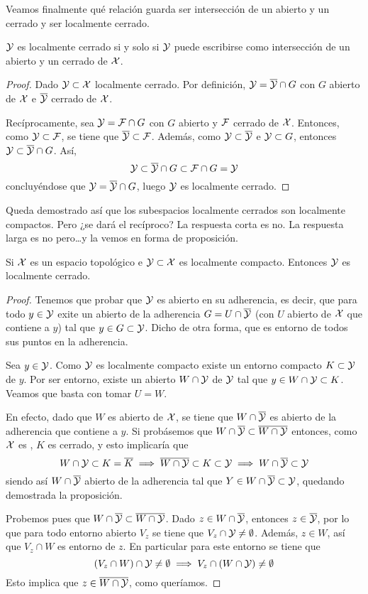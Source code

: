 Veamos finalmente qué relación guarda ser intersección de un abierto y un cerrado y ser localmente cerrado.
\begin{prop}
	$\mathcal{Y}$ es localmente cerrado si y solo si $\mathcal{Y}$ puede escribirse como intersección de un abierto y un cerrado de $\mathcal{X}$.	
\end{prop}
\begin{proof}
	Dado $\mathcal{Y}\subset\mathcal{X}$ localmente cerrado. Por definición, $\mathcal{Y}=\overline{\mathcal{Y}}\cap G$ con $G$ abierto de $\mathcal{X}$ e $\overline{\mathcal{Y}}$ cerrado de $\mathcal{X}$.
	
	Recíprocamente, sea $\mathcal{Y}=\mathcal{F}\cap G$ con $G$ abierto y $\mathcal{F}$ cerrado de $\mathcal{X}$. Entonces, como $\mathcal{Y}\subset\mathcal{F}$, se tiene que $\overline{\mathcal{Y}}\subset\mathcal{F}$. Además, como $\mathcal{Y}\subset\overline{\mathcal{Y}}$ e $\mathcal{Y}\subset G$, entonces $\mathcal{Y}\subset \overline{\mathcal{Y}}\cap G$. Así,
	\[\mathcal{Y}\subset \overline{\mathcal{Y}}\cap G\subset \mathcal{F}\cap G=\mathcal{Y}\]
	concluyéndose que $\mathcal{Y}=\overline{\mathcal{Y}}\cap G$, luego $\mathcal{Y}$ es localmente cerrado.
\end{proof}

Queda demostrado así que los subespacios localmente cerrados son localmente compactos. Pero ¿se dará el recíproco? La respuesta corta es no. La respuesta larga es no pero\dots y la vemos en forma de proposición.

\begin{prop}
	Si $\mathcal{X}$ es un espacio topológico \hausdorff e $\mathcal{Y}\subset\mathcal{X}$ es localmente compacto. Entonces $\mathcal{Y}$ es localmente cerrado.
\end{prop}
\begin{proof}
	Tenemos que probar que $\mathcal{Y}$ es abierto en su adherencia, es decir, que para todo $y\in\mathcal{Y}$ exite un abierto de la adherencia $G=U\cap\overline{\mathcal{Y}}$ (con $U$ abierto de $\mathcal{X}$ que contiene a $y$) tal que $y\in G\subset \mathcal{Y}$. Dicho de otra forma, que es entorno de todos sus puntos en la adherencia.
	
	Sea $y\in\mathcal{Y}$. Como $\mathcal{Y}$ es localmente compacto existe un entorno compacto $K\subset\mathcal{Y}$ de $y$. Por ser entorno, existe un abierto $W\cap\mathcal{Y}$ de $\mathcal{Y}$ tal que $y\in W\cap\mathcal{Y}\subset K$. Veamos que basta con tomar $U=W$.
	
	En efecto, dado que $W$ es abierto de $\mathcal{X}$, se tiene que $W\cap \overline{\mathcal{Y}}$ es abierto de la adherencia que contiene a $y$. Si probásemos que $W\cap \overline{\mathcal{Y}}\subset \overline{W\cap\mathcal{Y}}$ entonces, como $\mathcal{X}$ es \hausdorff, $K$ es cerrado, y esto implicaría que
	\[W\cap \mathcal{Y}\subset K=\overline{K}\implies \overline{W\cap\mathcal{Y}}\subset K\subset\mathcal{Y}\implies W\cap \overline{\mathcal{Y}}\subset\mathcal{Y} \]
	siendo así $W\cap \overline{\mathcal{Y}}$ abierto de la adherencia tal que $Y\in W\cap \overline{\mathcal{Y}}\subset\mathcal{Y}$, quedando demostrada la proposición.
	
	Probemos pues que $W\cap \overline{\mathcal{Y}}\subset \overline{W\cap\mathcal{Y}}$. Dado $z\in W\cap \overline{\mathcal{Y}}$, entonces $z\in \overline{\mathcal{Y}}$, por lo que para todo entorno abierto $V_z$ se tiene que $V_z\cap\mathcal{Y}\not=\emptyset$. Además, $z\in W$, así que $V_z\cap W$ es entorno de $z$. En particular para este entorno se tiene que
	\[(V_z\cap W)\cap \mathcal{Y}\not=\emptyset\implies V_z\cap(W\cap\mathcal{Y})\not=\emptyset\]
	Esto implica que $z\in \overline{W\cap\mathcal{Y}}$, como queríamos.
\end{proof}

